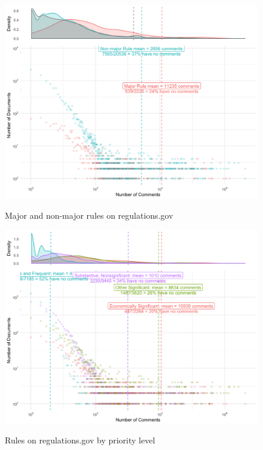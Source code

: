 \documentclass{article}
\begin{document}
\begin{figure}[p!]
    \centering
        \caption{Major and non-major rules on regulations.gov}
    \includegraphics[width = 7in]{Figs/major-comments-density-1.png}
    \label{fig:rules-major}
\end{figure}

\begin{figure}[p!]
    \centering
        \caption{Rules on regulations.gov by priority level}
    \includegraphics[width = 7in]{Figs/priority-comment-density-1.png}
    \label{fig:rules-priority}
\end{figure}
\clearpage 



\singlespace
\small
 

\end{document}
